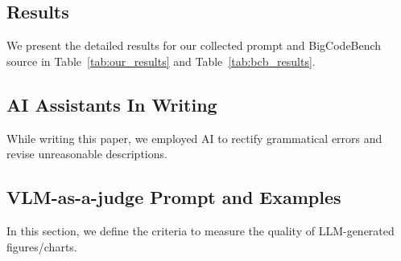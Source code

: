 \subsection{Results}
We present the detailed results for our collected prompt and BigCodeBench source in Table~\ref{tab:our_results} and Table~\ref{tab:bcb_results}.






\subsection{AI Assistants In Writing}
While writing this paper, we employed AI to rectify grammatical errors and revise unreasonable descriptions.



\subsection{VLM-as-a-judge Prompt and Examples}
\label{sec:vlm_prompt}
In this section, we define the criteria to measure the quality of LLM-generated figures/charts.



\clearpage








